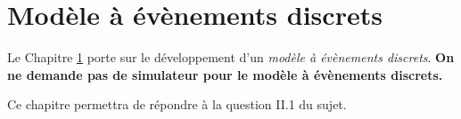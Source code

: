 \chapter{Modèle à évènements discrets}
\label{chapitre:etat_discret}

Le Chapitre \ref{chapitre:etat_discret} porte sur le développement d’un \textit{modèle à évènements discrets}. \textbf{On ne demande pas de simulateur pour le modèle à évènements discrets.}

Ce chapitre permettra de répondre à la question II.1 du sujet.
